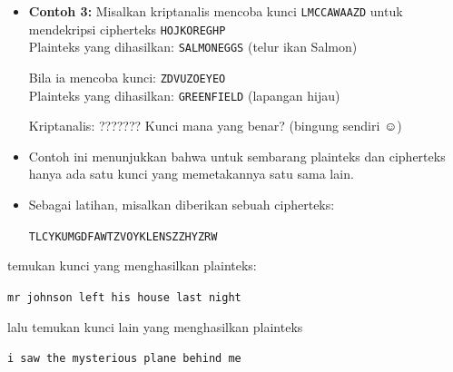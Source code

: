 \documentclass{article}
\begin{document}
\newpage


\begin{itemize}
  \item \textbf{Contoh 3:} Misalkan kriptanalis mencoba kunci \texttt{LMCCAWAAZD} untuk mendekripsi cipherteks \texttt{HOJKOREGHP} \\
  Plainteks yang dihasilkan: \texttt{SALMONEGGS} \quad (telur ikan Salmon)
  
  \vspace{5mm}
  
  Bila ia mencoba kunci: \texttt{ZDVUZOEYEO} \\
  Plainteks yang dihasilkan: \texttt{GREENFIELD} \quad (lapangan hijau)
  
  \vspace{5mm}
  
  Kriptanalis: ??????? Kunci mana yang benar? (bingung sendiri $\smiley$)
  
  \vspace{5mm}
  
  \item Contoh ini menunjukkan bahwa untuk sembarang plainteks dan cipherteks hanya ada satu kunci yang memetakannya satu sama lain.
\end{itemize}

\newpage


\begin{itemize}
    \item Sebagai latihan, misalkan diberikan sebuah cipherteks:
    \begin{center}
        \texttt{TLCYKUMGDFAWTZVOYKLENSZZHYZRW}
    \end{center}
\end{itemize}

temukan kunci yang menghasilkan plainteks:
\begin{center}
    \texttt{mr johnson left his house last night}
\end{center}

lalu temukan kunci lain yang menghasilkan plainteks
\begin{center}
    \texttt{i saw the mysterious plane behind me}
\end{center}

\newpage

\end{document}
